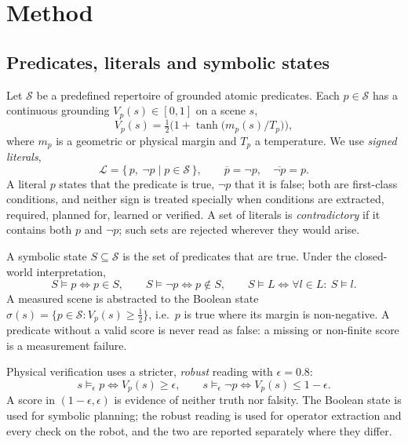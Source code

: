 
\section{Method}
\label{sec:method}

\subsection{Predicates, literals and symbolic states}
\label{sec:literals}

Let $\mathcal{S}$ be a predefined repertoire of grounded atomic predicates. Each
$p\in\mathcal{S}$ has a continuous grounding $V_p(s)\in[0,1]$ on a scene $s$,
\begin{equation}
  V_p(s)=\tfrac12\bigl(1+\tanh\bigl(m_p(s)/T_p\bigr)\bigr),
\end{equation}
where $m_p$ is a geometric or physical margin and $T_p$ a temperature. We use
\emph{signed literals},
\begin{equation}
  \mathcal{L}=\{\,p,\ \neg p \mid p\in\mathcal{S}\,\},\qquad
  \overline{p}=\neg p,\quad \overline{\neg p}=p .
\end{equation}
A literal $p$ states that the predicate is true, $\neg p$ that it is false; both are
first-class conditions, and neither sign is treated specially when conditions are
extracted, required, planned for, learned or verified. A set of literals is
\emph{contradictory} if it contains both $p$ and $\neg p$; such sets are rejected
wherever they would arise.

A symbolic state $S\subseteq\mathcal{S}$ is the set of predicates that are true. Under
the closed-world interpretation,
\begin{equation}
  S\models p \iff p\in S,\qquad S\models\neg p \iff p\notin S,\qquad
  S\models L \iff \forall l\in L:\ S\models l .
\end{equation}
A measured scene is abstracted to the Boolean state
$\sigma(s)=\{p\in\mathcal{S} : V_p(s)\ge \tfrac12\}$, i.e.\ $p$ is true where its margin
is non-negative. A predicate without a valid score is never read as false: a missing
or non-finite score is a measurement failure.

Physical verification uses a stricter, \emph{robust} reading with $\epsilon=0.8$:
\begin{equation}
  s\models_\epsilon p \iff V_p(s)\ge\epsilon,\qquad
  s\models_\epsilon \neg p \iff V_p(s)\le 1-\epsilon .
  \label{eq:robust}
\end{equation}
A score in $(1-\epsilon,\epsilon)$ is evidence of neither truth nor falsity. The
Boolean state is used for symbolic planning; the robust reading is used for operator
extraction and every check on the robot, and the two are reported separately where
they differ.


